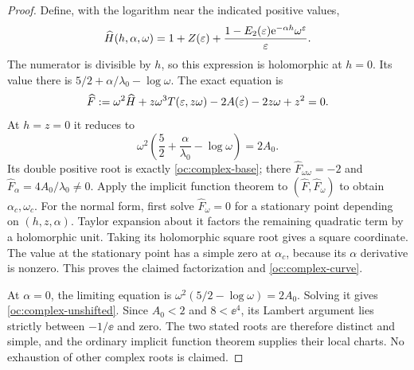 \begin{proof}
Define, with the logarithm near the indicated positive values,
\[
 \widehat H(h,\alpha,\omega)=1+Z(\varepsilon)
    +\frac{1-E_2(\varepsilon)\mathrm e^{-\alpha h}\omega^\varepsilon}{\varepsilon}.
\]
The numerator is divisible by $h$, so this expression is
holomorphic at $h=0$. Its value there is
$5/2+\alpha/\lambda_0-\log\omega$. The exact equation is
\begin{equation}\label{oc:complex-equation}
 \widehat F:=\omega^2\widehat H+z\omega^3T(\varepsilon,z\omega)
               -2A(\varepsilon)-2z\omega+z^2=0.
\end{equation}
At $h=z=0$ it reduces to
\[
 \omega^2\left(\frac52+\frac\alpha{\lambda_0}-\log\omega\right)=2A_0.
\]
Its double positive root is exactly \eqref{oc:complex-base}; there
$\widehat F_{\omega\omega}=-2$ and
$\widehat F_\alpha=4A_0/\lambda_0\ne0$. Apply the implicit
function theorem to $(\widehat F,\widehat F_\omega)$ to obtain
$\alpha_c,\omega_c$. For the normal form, first solve
$\widehat F_\omega=0$ for a stationary point depending on
$(h,z,\alpha)$. Taylor expansion about it factors the remaining
quadratic term by a holomorphic unit. Taking its holomorphic square
root gives a square coordinate. The value at the stationary point
has a simple zero at $\alpha_c$, because its $\alpha$ derivative
is nonzero. This proves the claimed factorization and
\eqref{oc:complex-curve}.

At $\alpha=0$, the limiting equation is
$\omega^2(5/2-\log\omega)=2A_0$. Solving it gives
\eqref{oc:complex-unshifted}. Since $A_0<2$ and $8<\ee^4$,
its Lambert argument lies strictly between $-1/\ee$ and zero.
The two stated roots are therefore distinct and simple, and the
ordinary implicit function theorem supplies their local charts.
No exhaustion of other complex roots is claimed.
\end{proof}

